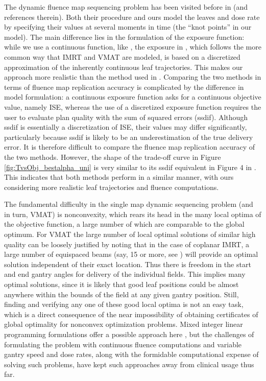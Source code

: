 \documentclass{iopart}
\begin{document}
The dynamic fluence map sequencing problem has been visited before in \cite{balvertcraft} (and references therein). Both their procedure and ours model the leaves and dose rate by specifying their values at several moments in time (the ``knot points'' in our model). The main difference lies in the formulation of the exposure function: while we use a continuous function, like \cite{pappvmat}, the exposure in \cite{balvertcraft}, which follows the more common way that IMRT and VMAT are modeled, is based on a discretized approximation of the inherently continuous leaf trajectories. This makes our approach more realistic than the method used in \cite{balvertcraft}. Comparing the two methods in terms of fluence map replication accuracy is complicated by the difference in model formulation: a continuous exposure function asks for a continuous objective value, namely ISE, whereas the use of a discretized exposure function requires the user to evaluate plan quality with the sum of squared errors (ssdif). Although ssdif is essentially a discretization of ISE, their values may differ significantly, particularly because ssdif is likely to be an underestimation of the true delivery error. It is therefore difficult to compare the fluence map replication accuracy of the two methods. However, the shape of the trade-off curve in Figure \ref{fig:TvsObj_bestalpha_uni} is very similar to its ssdif equivalent in Figure 4 in \cite{balvertcraft}. This indicates that both methods perform in a similar manner, with ours considering more realistic leaf trajectories and fluence computations.


The fundamental difficulty in the single map dynamic sequencing problem (and in turn, VMAT) is nonconvexity, which rears its head in the many local optima of the objective function, a large number of which are comparable to the global optimum. For VMAT the large number of local optimal solutions of similar high quality can be loosely justified by noting that in the case of coplanar IMRT, a large number of equispaced beams (say, 15 or more, see \cite{bortBeams}) will provide an optimal solution independent of their exact location. Thus there is freedom in the start and end gantry angles for delivery of the individual fields. This implies many optimal solutions, since it is likely that good leaf positions could be almost anywhere within the bounds of the field at any given gantry position. Still, finding and verifying any one of these good local optima is not an easy task, which is a direct consequence of the near impossibility of obtaining certificates of global optimality for nonconvex optimization problems. Mixed integer linear programming formulations offer a possible approach here \cite{mipvmat1,mipvmat2,mipvmat3}, but the challenges of formulating the problem with continuous fluence computations and variable gantry speed and dose rates, along with the formidable computational expense of solving such problems, have kept such approaches away from clinical usage thus far.
\end{document}
